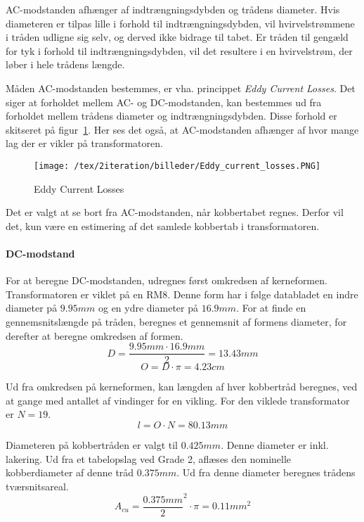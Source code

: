 AC-modstanden afhænger af indtrængningsdybden og trådens diameter. Hvis diameteren er tilpas lille i forhold til indtrængningsdybden, vil  hvirvelstrømmene i tråden udligne sig selv, og derved ikke bidrage til tabet. Er tråden til gengæld for tyk i forhold til indtrængningsdybden, vil det resultere i en hvirvelstrøm, der løber i hele trådens længde. 

Måden AC-modstanden bestemmes, er vha. princippet \textit{Eddy Current Losses}. Det siger at forholdet mellem AC- og DC-modstanden, kan bestemmes ud fra forholdet mellem trådens diameter og indtrængningsdybden. Disse forhold er skitseret på figur~\ref{fig:Eddy_current_losses}\cite{eddyCurrentLosses}. Her ses det også, at AC-modstanden afhænger af hvor mange lag der er vikler på transformatoren. 

\begin{figure}[H]
	\center
	\texttt{[image: /tex/2iteration/billeder/Eddy\_current\_losses.PNG]}
	\caption{Eddy Current Losses}
	\label{fig:Eddy_current_losses}
\end{figure}

Det er valgt at se bort fra AC-modstanden, når kobbertabet regnes. Derfor vil det, kun være en estimering af det samlede kobbertab i transformatoren. 

\paragraph{DC-modstand}
For at beregne DC-modstanden, udregnes først omkredsen af kerneformen. Transformatoren er viklet på en RM8. Denne form har i følge databladet en indre diameter på $9.95mm$ og en ydre diameter på $16.9mm$. For at finde en gennemsnitslængde på tråden, beregnes et gennemsnit af formens diameter, for derefter at beregne omkredsen af formen.
\begin{equation} \label{Diameter}
D = \frac{9.95mm \cdot 16.9mm}{2} = 13.43mm
\end{equation}
\begin{equation} \label{Omkreds}
O = D \cdot \pi = 4.23cm
\end{equation}

Ud fra omkredsen på kerneformen, kan længden af hver kobbertråd beregnes, ved at gange med antallet af vindinger for en vikling. For den viklede transformator er $N=19$.
\begin{equation} \label{Lengde}
l = O \cdot N = 80.13mm
\end{equation}

Diameteren på kobbertråden er valgt til $0.425mm$. Denne diameter er inkl. lakering. Ud fra et tabelopslag ved Grade 2\cite{wire-diameter}, aflæses den nominelle kobberdiameter af denne tråd $0.375mm$.
Ud fra denne diameter beregnes trådens tværsnitsareal.
\begin{equation} \label{kobber-areal}
A_{cu} = \frac{0.375mm}{2}^2 \cdot \pi = 0.11mm^2
\end{equation}

